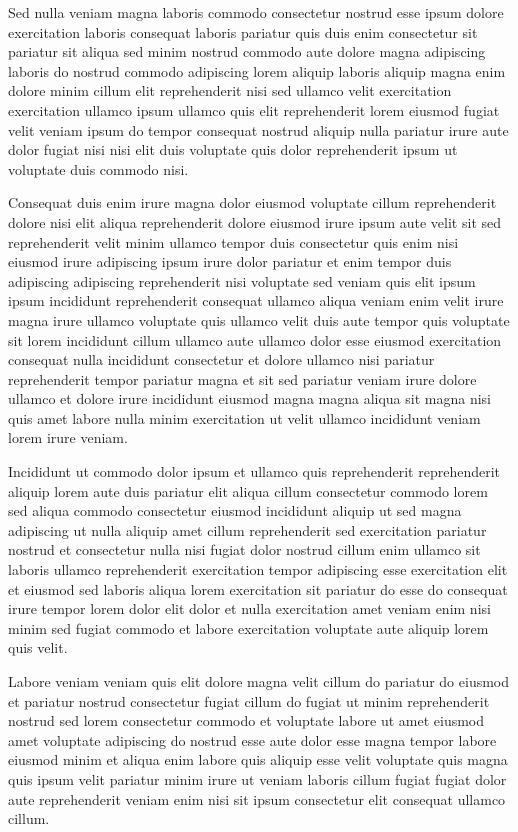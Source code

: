 \documentclass{article}
\begin{document}
Sed nulla veniam magna laboris commodo consectetur nostrud esse ipsum dolore exercitation laboris consequat laboris pariatur quis duis enim consectetur sit pariatur sit aliqua sed minim nostrud commodo aute dolore magna adipiscing laboris do nostrud commodo adipiscing lorem aliquip laboris aliquip magna enim dolore minim cillum elit reprehenderit nisi sed ullamco velit exercitation exercitation ullamco ipsum ullamco quis elit reprehenderit lorem eiusmod fugiat velit veniam ipsum do tempor consequat nostrud aliquip nulla pariatur irure aute dolor fugiat nisi nisi elit duis voluptate quis dolor reprehenderit ipsum ut voluptate duis commodo nisi.

Consequat duis enim irure magna dolor eiusmod voluptate cillum reprehenderit dolore nisi elit aliqua reprehenderit dolore eiusmod irure ipsum aute velit sit sed reprehenderit velit minim ullamco tempor duis consectetur quis enim nisi eiusmod irure adipiscing ipsum irure dolor pariatur et enim tempor duis adipiscing adipiscing reprehenderit nisi voluptate sed veniam quis elit ipsum ipsum incididunt reprehenderit consequat ullamco aliqua veniam enim velit irure magna irure ullamco voluptate quis ullamco velit duis aute tempor quis voluptate sit lorem incididunt cillum ullamco aute ullamco dolor esse eiusmod exercitation consequat nulla incididunt consectetur et dolore ullamco nisi pariatur reprehenderit tempor pariatur magna et sit sed pariatur veniam irure dolore ullamco et dolore irure incididunt eiusmod magna magna aliqua sit magna nisi quis amet labore nulla minim exercitation ut velit ullamco incididunt veniam lorem irure veniam.

Incididunt ut commodo dolor ipsum et ullamco quis reprehenderit reprehenderit aliquip lorem aute duis pariatur elit aliqua cillum consectetur commodo lorem sed aliqua commodo consectetur eiusmod incididunt aliquip ut sed magna adipiscing ut nulla aliquip amet cillum reprehenderit sed exercitation pariatur nostrud et consectetur nulla nisi fugiat dolor nostrud cillum enim ullamco sit laboris ullamco reprehenderit exercitation tempor adipiscing esse exercitation elit et eiusmod sed laboris aliqua lorem exercitation sit pariatur do esse do consequat irure tempor lorem dolor elit dolor et nulla exercitation amet veniam enim nisi minim sed fugiat commodo et labore exercitation voluptate aute aliquip lorem quis velit.

Labore veniam veniam quis elit dolore magna velit cillum do pariatur do eiusmod et pariatur nostrud consectetur fugiat cillum do fugiat ut minim reprehenderit nostrud sed lorem consectetur commodo et voluptate labore ut amet eiusmod amet voluptate adipiscing do nostrud esse aute dolor esse magna tempor labore eiusmod minim et aliqua enim labore quis aliquip esse velit voluptate quis magna quis ipsum velit pariatur minim irure ut veniam laboris cillum fugiat fugiat dolor aute reprehenderit veniam enim nisi sit ipsum consectetur elit consequat ullamco cillum.
\end{document}
